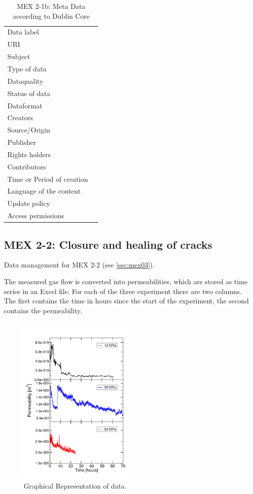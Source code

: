 \begin{table}[h!]
\caption{MEX 2-1b: Meta Data according to Dublin Core}
\label{tab:}
\small
\begin{tabular}{R{3cm}|L{7cm}}
\hline
%
Data label &  \\
URI &  \\
Subject  &  \\
Type of data  &  \\
Dataquality  &  \\
Status of data  &  \\
Dataformat  & \\
Creators  &  \\
Source/Origin &  \\
Publisher  &  \\
Rights holders &  \\
Contributors &  \\
Time or Period of creation &  \\
Language of the content &  \\
Update policy &  \\
Access permissions &  \\
%
\hline
\end{tabular}
\end{table}


\subsection{MEX 2-2: Closure and healing of cracks}

Data management for MEX 2-2 (see \ref{sec:mex03}).

The measured gas flow is converted into permeabilities, which are stored as time series in an Excel file. For each of the three experiment there are two columns. The first contains the time in hours since the start of the experiment, the second contains the permeability. 

\begin{figure}[!ht]
\centering
\includegraphics[width=0.5\textwidth]{figures/mex3-perme-time-comparison.png}
\caption{Graphical Representation of data.}
\label{fig:ME3-perme-exp-dmp}
\end{figure}

